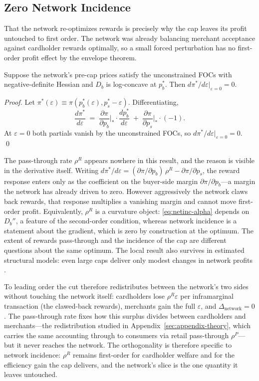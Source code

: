 \documentclass[main.tex]{subfiles}
\begin{document}
\subsection{Zero Network Incidence}

That the network re-optimizes rewards is precisely why the cap leaves its profit untouched to first order. The network was already balancing merchant acceptance against cardholder rewards optimally, so a small forced perturbation has no first-order profit effect by the envelope theorem.

\begin{theorem}\label{thm:network-incidence}
Suppose the network's pre-cap prices satisfy the unconstrained FOCs with negative-definite Hessian and $D_b$ is log-concave at $p_b^*$. Then $d\pi^*/d\varepsilon\big|_{\varepsilon=0}=0$.
\end{theorem}

\begin{proof}
Let $\pi^*(\varepsilon)\equiv\pi(p_b^*(\varepsilon),p_s^*-\varepsilon)$. Differentiating,
\[
\frac{d\pi^*}{d\varepsilon}\;=\;\frac{\partial\pi}{\partial p_b}\bigg|_*\cdot\frac{dp_b^*}{d\varepsilon}\;+\;\frac{\partial\pi}{\partial p_s}\bigg|_*\cdot(-1).
\]
At $\varepsilon=0$ both partials vanish by the unconstrained FOCs, so $d\pi^*/d\varepsilon|_{\varepsilon=0}=0$. \qed
\end{proof}

The pass-through rate $\rho^R$ appears nowhere in this result, and the reason is visible in the derivative itself.
Writing $d\pi^*/d\varepsilon=(\partial\pi/\partial p_b)\,\rho^R-\partial\pi/\partial p_s$, the reward response enters only as the coefficient on the buyer-side margin $\partial\pi/\partial p_b$---a margin the network has already driven to zero.
However aggressively the network claws back rewards, that response multiplies a vanishing margin and cannot move first-order profit.
Equivalently, $\rho^R$ is a curvature object: \eqref{eq:netinc-alpha} depends on $D_b''$, a feature of the second-order condition, whereas network incidence is a statement about the gradient, which is zero by construction at the optimum.
The extent of rewards pass-through and the incidence of the cap are different questions about the same optimum.
The local result also survives in estimated structural models: even large caps deliver only modest changes in network profits \citep{Wang2025}.

To leading order the cut therefore redistributes between the network's two sides without touching the network itself: cardholders lose $\rho^R\varepsilon$ per inframarginal transaction (the clawed-back rewards), merchants gain the full $\varepsilon$, and $\Delta_{\text{network}}=0$.
The pass-through rate fixes how this surplus divides between cardholders and merchants---the redistribution studied in Appendix~\ref{sec:appendix-theory}, which carries the same accounting through to consumers via retail pass-through $\rho^P$---but it never reaches the network.
The orthogonality is therefore specific to network incidence: $\rho^R$ remains first-order for cardholder welfare and for the efficiency gain the cap delivers, and the network's slice is the one quantity it leaves untouched.
\end{document}
